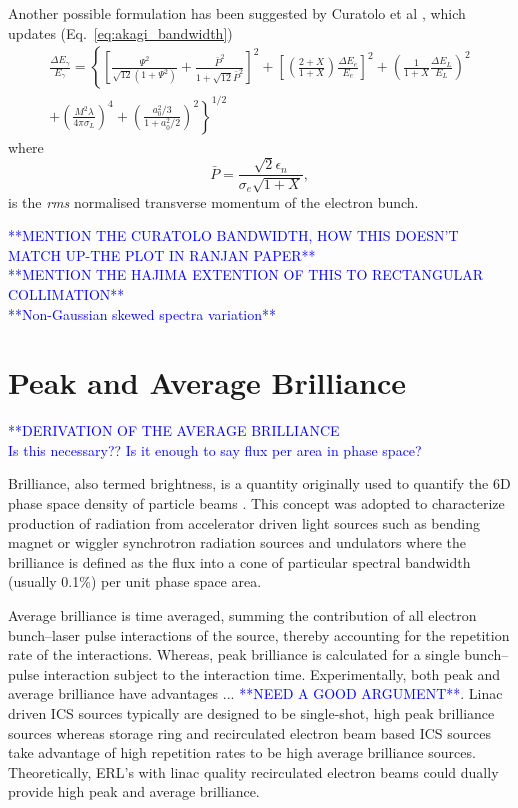 \documentclass[../main.tex]{subfiles}
\begin{document}
Another possible formulation has been suggested by Curatolo et al \cite{curatolo2017analytical}, which updates (Eq.~\ref{eq:akagi_bandwidth})
\begin{multline}
\frac{\Delta E_{\gamma}}{E_{\gamma}} = \left\{\left[\frac{\Psi^{2}}{\sqrt{12}\left(1+\Psi^{2}\right)}+\frac{\bar{P}^{2}}{1+\sqrt{12}\bar{P}^{2}}\right]^{2}+\left[\left(\frac{2+X}{1+X}\right)\frac{\Delta E_{e}}{E_{e}}\right]^{2}+\left(\frac{1}{1+X}\frac{\Delta E_{L}}{E_{L}}\right)^{2} \right.\\\left. +\left(\frac{M^{2}\lambda}{4\pi\sigma_{L}}\right)^{4}+\left(\frac{a_{0}^{2}/3}{1+a_{0}^{2}/2}\right)^{2}\right\}^{1/2}
\label{eq:curatolo_bandwidth}    
\end{multline}
where 
\begin{equation}
\bar{P} = \frac{\sqrt{2}\epsilon_{n}}{\sigma_{e}\sqrt{1+X}},
\label{eq:curatolo_p_bar}    
\end{equation}
is the \textit{rms} normalised transverse momentum of the electron bunch.

\textcolor{blue}{**MENTION THE CURATOLO BANDWIDTH, HOW THIS DOESN'T MATCH UP-THE PLOT IN RANJAN PAPER** \\ **MENTION THE HAJIMA EXTENTION OF THIS TO RECTANGULAR COLLIMATION** \\ **Non-Gaussian skewed spectra variation** }


\section{Peak and Average Brilliance}
\textcolor{blue}{**DERIVATION OF THE AVERAGE BRILLIANCE \\ Is this necessary?? Is it enough to say flux per area in phase space?}

Brilliance, also termed brightness, is a quantity originally used to quantify the 6D phase space density of particle beams \cite{courant1958theory}. This concept was adopted to characterize production of radiation from accelerator driven light sources such as bending magnet or wiggler synchrotron radiation sources and undulators \cite{kim1989characteristics} where the brilliance is defined as the flux into a cone of particular spectral bandwidth (usually 0.1\%) per unit phase space area. 

Average brilliance is time averaged, summing the contribution of all electron bunch--laser pulse interactions of the source, thereby accounting for the repetition rate of the interactions. Whereas, peak brilliance is calculated for a single bunch--pulse interaction subject to the interaction time. Experimentally, both peak and average brilliance have advantages ... \textcolor{blue}{**NEED A GOOD ARGUMENT**}. Linac driven ICS sources typically are designed to be single-shot, high peak brilliance sources whereas storage ring and recirculated electron beam based ICS sources take advantage of high repetition rates to be high average brilliance sources. Theoretically, ERL's with linac quality recirculated electron beams could dually provide high peak and average brilliance.   
\end{document}
